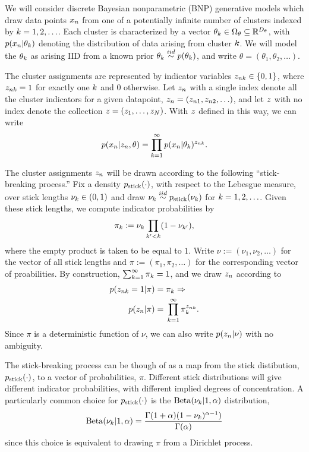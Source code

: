 We will consider discrete Bayesian nonparametric (BNP) generative models which
draw data points $x_n$ from one of a potentially infinite number of clusters
indexed by $k = 1, 2, \ldots$.  Each cluster is characterized by a vector
$\theta_k \in \Omega_{\theta} \subseteq \mathbb{R}^{D_{\theta}}$, with $p(x_n \vert
\theta_k)$ denoting the distribution of data arising from  cluster $k$. We
will model the $\theta_k$ as arising IID from a known prior $\theta_k \overset{iid}{\sim}
p(\theta_k)$, and write $\theta = (\theta_1, \theta_2, \ldots)$.

The cluster assignments are represented by indicator variables $z_{nk} \in
\{0, 1\}$, where $z_{nk} = 1$ for exactly one $k$ and $0$ otherwise.  Let
$z_n$ with a single index denote all the cluster indicators for a given
datapoint, $z_n = (z_{n1}, z_{n2}, \ldots)$, and let $z$ with no index
denote the collection $z = (z_1, \ldots, z_N)$.  With $z$ defined
in this way, we can write
%
\begin{align*}
%
p(\x_n \vert \z_\n, \theta) =
    \prod_{k=1}^\infty p(\x_n \vert \theta_\k)^{\z_{\n\k}}.
%
\end{align*}
%

The cluster assignments $z_{n}$ will be drawn according to the following
``stick-breaking process.''  Fix a density $p_{\mathrm{stick}}(\cdot)$, with respect to the
Lebesgue measure, over stick lengths $\nu_k \in (0, 1)$ and draw $\nu_k \overset{iid}{\sim}
p_{\mathrm{stick}}(\nu_k)$ for $k=1,2,\ldots$.  Given these stick lengths, we compute
indicator probabilities by
%
\begin{align*}
%
\pi_\k := \nu_\k \prod_{\k' < \k} (1 - \nu_{\k'}),
%
\end{align*}
%
where the empty product is taken to be equal to $1$. Write $\nu := (\nu_1,
\nu_2, \ldots)$ for the vector of all stick lengths and $\pi := (\pi_1, \pi_2,
\ldots)$ for the corresponding vector of proabilities. By construction,
$\sum_{k=1}^{\infty} \pi_k = 1$, and we draw $z_n$ according to
%
\begin{align*}
%
p(\z_{\n\k} = 1 \vert \pi) ={}& \pi_\k \Rightarrow \\
p(\z_\n \vert \pi) ={}& \prod_{k=1}^{\infty} \pi_\k^{\z_{\n\k}}.
%
\end{align*}
%
Since $\pi$ is a deterministic function of $\nu$, we can also write
$p(z_n \vert \nu)$ with no ambiguity.

The stick-breaking process can be though of as a map from  the stick
distibution, $p_{\mathrm{stick}}(\cdot)$, to a vector of probabilities, $\pi$. Different
stick distributions will give different indicator probabilities, with different
implied degrees of concentration.  A particularly common choice for
$p_{\mathrm{stick}}(\cdot)$ is the $\mathrm{Beta}(\nu_k \vert 1, \alpha)$ distribution,
%
\begin{align*}
%
\mathrm{Beta}(\nu_\k \vert 1, \alpha) =
    \frac{\Gamma(1 + \alpha) (1 - \nu_\k)^{\alpha - 1})}
         {\Gamma(\alpha)}
%
\end{align*}
%
since this choice is equivalent to drawing $\pi$ from a Dirichlet process.


